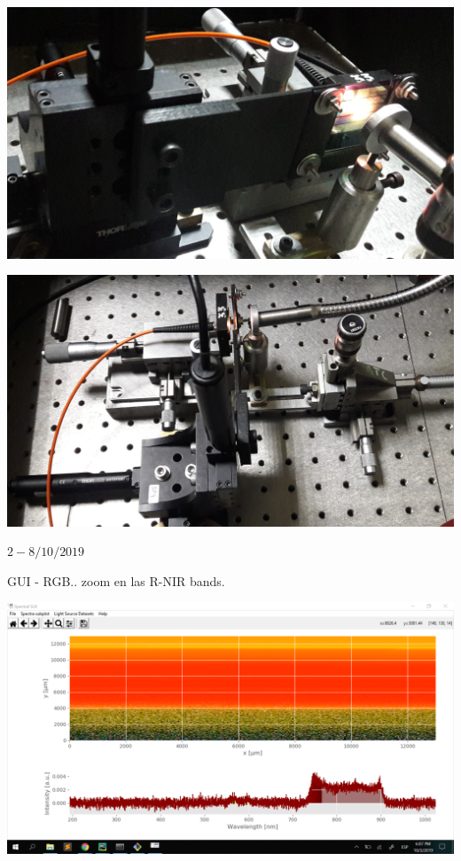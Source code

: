\documentclass[12pt,dvipsnames]{exam}
\begin{document}
\begin{center}
	\includegraphics[scale=0.1]{imgs/setup_barrido/9.jpg}
\end{center}

\begin{center}
	\includegraphics[scale=0.1]{imgs/setup_barrido/10.jpg}
\end{center}

\hrulefill

$2-8/10/2019$


 GUI - RGB.. zoom en las R-NIR bands.
\begin{center}
	\includegraphics[scale=0.25]{imgs/gui/gui2.png}
\end{center}
\end{document}
